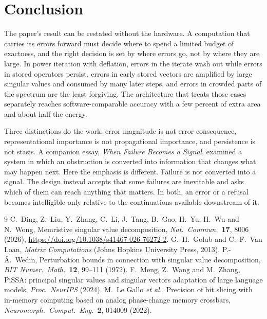 \documentclass[11pt]{article}
\theoremstyle{definition}
\theoremstyle{remark}
\begin{document}
\section{Conclusion}

The paper's result can be restated without the hardware. A computation that carries its errors forward must decide where to spend a limited budget of exactness, and the right decision is set by where errors go, not by where they are large. In power iteration with deflation, errors in the iterate wash out while errors in stored operators persist, errors in early stored vectors are amplified by large singular values and consumed by many later steps, and errors in crowded parts of the spectrum are the least forgiving. The architecture that treats those cases separately reaches software-comparable accuracy with a few percent of extra area and about half the energy.

Three distinctions do the work: error magnitude is not error consequence, representational importance is not propagational importance, and persistence is not stasis. A companion essay, \emph{When Failure Becomes a Signal}, examined a system in which an obstruction is converted into information that changes what may happen next. Here the emphasis is different. Failure is not converted into a signal. The design instead accepts that some failures are inevitable and asks which of them can reach anything that matters. In both, an error or a refusal becomes intelligible only relative to the continuations available downstream of it.

\begin{thebibliography}{9}
 C.~Ding, Z.~Liu, Y.~Zhang, C.~Li, J.~Tang, B.~Gao, H.~Yu, H.~Wu and N.~Wong, Memristive singular value decomposition, \emph{Nat.\ Commun.}\ \textbf{17}, 8006 (2026), \url{https://doi.org/10.1038/s41467-026-76272-2}.
 G.~H.~Golub and C.~F.~Van Loan, \emph{Matrix Computations} (Johns Hopkins University Press, 2013).
 P.-{\AA}.~Wedin, Perturbation bounds in connection with singular value decomposition, \emph{BIT Numer.\ Math.}\ \textbf{12}, 99--111 (1972).
 F.~Meng, Z.~Wang and M.~Zhang, PiSSA: principal singular values and singular vectors adaptation of large language models, \emph{Proc.\ NeurIPS} (2024).
 M.~Le Gallo \emph{et al.}, Precision of bit slicing with in-memory computing based on analog phase-change memory crossbars, \emph{Neuromorph.\ Comput.\ Eng.}\ \textbf{2}, 014009 (2022).
\end{thebibliography}
\end{document}
